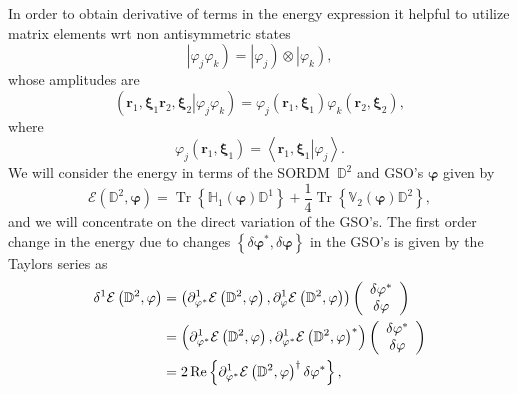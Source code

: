 \documentclass[aps,preprint]{revtex4}%
\begin{document}
In order to obtain derivative of terms in the energy expression it helpful to
utilize matrix elements wrt non antisymmetric states
\begin{equation}
\left\vert \varphi_{j}\varphi_{k}\right)  =\left\vert \varphi_{j}\right)
\otimes\left\vert \varphi_{k}\right)  ,
\end{equation}
whose amplitudes are
\begin{equation}
\left(  \left.  \mathbf{r}_{1}\mathbf{,\xi}_{1}\mathbf{r}_{2}\mathbf{,\xi}%
_{2}\right\vert \varphi_{j}\varphi_{k}\right)  =\varphi_{j}\left(
\mathbf{r}_{1}\mathbf{,\xi}_{1}\right)  \varphi_{k}\left(  \mathbf{r}%
_{2}\mathbf{,\xi}_{2}\right)  ,
\end{equation}
where
\begin{equation}
\varphi_{j}\left(  \mathbf{r}_{1}\mathbf{,\xi}_{1}\right)  =\left\langle
\left.  \mathbf{r}_{1}\mathbf{,\xi}_{1}\right\vert \varphi_{j}\right\rangle .
\end{equation}
We will consider the energy in terms of the SORDM\ $\mathbb{D}^{2}$ and GSO's
$\mathbf{\varphi}$ given by
\begin{equation}
\mathcal{E}\left(  \mathbb{D}^{2},\mathbf{\varphi}\right)  =\operatorname{Tr}%
\left\{  \mathbb{H}_{1}\left(  \mathbf{\varphi}\right)  \mathbb{D}%
^{1}\right\}  +\frac{1}{4}\operatorname{Tr}\left\{  \mathbb{V}_{2}\left(
\mathbf{\varphi}\right)  \mathbb{D}^{2}\right\}  , \label{e1}%
\end{equation}
and we will concentrate on the direct variation of the GSO's. The first order
change in the energy due to changes $\left\{  \delta\mathbf{\varphi}^{\ast
},\delta\mathbf{\varphi}\right\}  $ in the GSO's is given by the Taylors
series as
\begin{align}
\delta^{1}\mathcal{E}\left(  \mathbb{D}^{2},\mathbf{\varphi}\right)   &
=\left(  \partial_{\mathbf{\varphi}^{\ast}}^{1}\mathcal{E}\left(
\mathbb{D}^{2},\mathbf{\varphi}\right)  ,\partial_{\mathbf{\varphi}}%
^{1}\mathcal{E}\left(  \mathbb{D}^{2},\mathbf{\varphi}\right)  \right)
\left(
\begin{array}
[c]{c}%
\delta\mathbf{\varphi}^{\ast}\\
\delta\mathbf{\varphi}%
\end{array}
\right) \nonumber\\
&  =\left(  \partial_{\mathbf{\varphi}^{\ast}}^{1}\mathcal{E}\left(
\mathbb{D}^{2},\mathbf{\varphi}\right)  ,\partial_{\mathbf{\varphi}^{\ast}%
}^{1}\mathcal{E}\left(  \mathbb{D}^{2},\mathbf{\varphi}\right)  ^{\ast
}\right)  \left(
\begin{array}
[c]{c}%
\delta\mathbf{\varphi}^{\ast}\\
\delta\mathbf{\varphi}%
\end{array}
\right) \nonumber\\
&  =2\operatorname{Re}\left\{  \partial_{\mathbf{\varphi}^{\ast}}%
^{1}\mathcal{E}\left(  \mathbb{D}^{2},\mathbf{\varphi}\right)  ^{\dagger
}\delta\mathbf{\varphi}^{\ast}\right\}  ,
\end{align}
\end{document}
